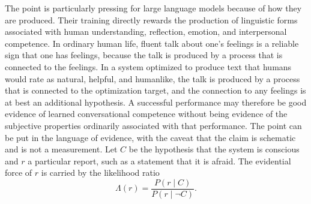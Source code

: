 \documentclass[12pt]{article}
\theoremstyle{definition}
\begin{document}
The point is particularly pressing for large language models because of how they are produced. Their training directly rewards the production of linguistic forms associated with human understanding, reflection, emotion, and interpersonal competence. In ordinary human life, fluent talk about one's feelings is a reliable sign that one has feelings, because the talk is produced by a process that is connected to the feelings. In a system optimized to produce text that humans would rate as natural, helpful, and humanlike, the talk is produced by a process that is connected to the optimization target, and the connection to any feelings is at best an additional hypothesis. A successful performance may therefore be good evidence of learned conversational competence without being evidence of the subjective properties ordinarily associated with that performance. The point can be put in the language of evidence, with the caveat that the claim is schematic and is not a measurement. Let $C$ be the hypothesis that the system is conscious and $r$ a particular report, such as a statement that it is afraid. The evidential force of $r$ is carried by the likelihood ratio
\begin{equation}
\Lambda(r)=\frac{P(r\mid C)}{P(r\mid \neg C)}.
\end{equation}
\end{document}
